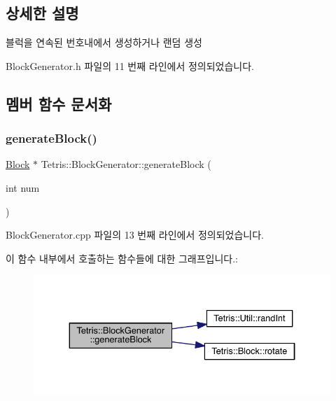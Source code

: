 \subsection{상세한 설명}
블럭을 연속된 번호내에서 생성하거나 랜덤 생성 

Block\+Generator.\+h 파일의 11 번째 라인에서 정의되었습니다.



\subsection{멤버 함수 문서화}
\mbox{\label{class_tetris_1_1_block_generator_a581b22cebe170d3fe8b51130c01e7a22}} 
\subsubsection{\texorpdfstring{generate\+Block()}{generateBlock()}\hspace{0.1cm}{\footnotesize\ttfamily [1/2]}}
{\footnotesize\ttfamily \hyperlink{class_tetris_1_1_block}{Block} $\ast$ Tetris\+::\+Block\+Generator\+::generate\+Block (\begin{DoxyParamCaption}\item[{int}]{num }\end{DoxyParamCaption})}



Block\+Generator.\+cpp 파일의 13 번째 라인에서 정의되었습니다.

이 함수 내부에서 호출하는 함수들에 대한 그래프입니다.\+:
\nopagebreak
\begin{figure}[H]
\begin{center}
\leavevmode
\includegraphics[width=334pt]{class_tetris_1_1_block_generator_a581b22cebe170d3fe8b51130c01e7a22_cgraph}
\end{center}
\end{figure}
\mbox{\label{class_tetris_1_1_block_generator_a584fde2bfe1cdd4505bd905befd73d21}} 
